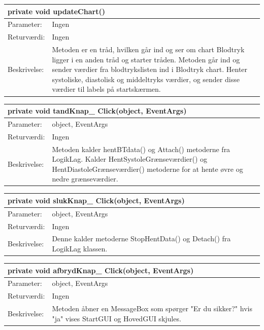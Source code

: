 \begin{table}[H]
\label{tab:tabel2}
\begin{tabular}{| l | p{13cm} |}
   \hline
   \multicolumn{2}{|l|}{private void updateChart()} \\ \hline
   Parameter: & Ingen\\ \hline
   Returværdi: & Ingen \\ \hline
   Beskrivelse: & Metoden er en tråd, hvilken går ind og ser om chart Blodtryk ligger i en anden tråd og starter tråden. Metoden går ind og sender værdier fra blodtrykslisten ind i Blodtryk chart. Henter systoliske, diastolisk og middeltryks værdier, og sender disse værdier til labels på startskærmen.\\ \hline
\end{tabular}
\end{table}
\begin{table}[H]
\label{tab:tabel2}
\begin{tabular}{| l | p{13cm} |}
   \hline
   \multicolumn{2}{|l|}{private void tandKnap\_ Click(object, EventArgs) } \\ \hline
   Parameter: & object, EventArgs\\ \hline
   Returværdi: & Ingen \\ \hline
   Beskrivelse: & Metoden kalder hentBTdata() og Attach() metoderne fra LogikLag. Kalder HentSystoleGrænseværdier() og HentDiastoleGrænseværdier() metoderne for at hente øvre og nedre grænseværdier.\\ \hline
\end{tabular}
\end{table}
\begin{table}[H]
\label{tab:tabel2}
\begin{tabular}{| l | p{13cm} |}
   \hline
   \multicolumn{2}{|l|}{private void slukKnap\_ Click(object, EventArgs) } \\ \hline
   Parameter: & object, EventArgs\\ \hline
   Returværdi: & Ingen \\ \hline
   Beskrivelse: & Denne kalder metoderne StopHentData() og Detach() fra LogikLag klassen.\\ \hline
\end{tabular}
\end{table}
\begin{table}[H]
\label{tab:tabel2}
\begin{tabular}{| l | p{13cm} |}
   \hline
   \multicolumn{2}{|l|}{private void afbrydKnap\_ Click(object, EventArgs)} \\ \hline
   Parameter: & object, EventArgs\\ \hline
   Returværdi: & Ingen \\ \hline
   Beskrivelse: & Metoden åbner en MessageBox som spørger "Er du sikker?" hvis "ja" vises StartGUI og HovedGUI skjules.\\ \hline
\end{tabular}
\end{table}
